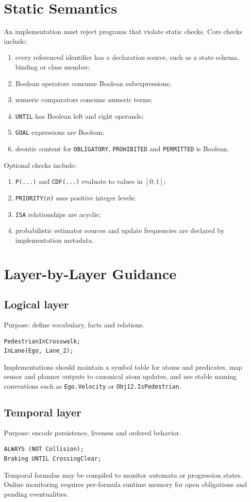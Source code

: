 \documentclass[11pt,a4paper]{article}
\begin{document}
\section{Static Semantics}
An implementation must reject programs that violate static checks. Core checks include:
\begin{enumerate}
  \item every referenced identifier has a declaration source, such as a state schema, binding or class member;
  \item Boolean operators consume Boolean subexpressions;
  \item numeric comparators consume numeric terms;
  \item \texttt{UNTIL} has Boolean left and right operands;
  \item \texttt{GOAL} expressions are Boolean;
  \item deontic content for \texttt{OBLIGATORY}, \texttt{PROHIBITED} and \texttt{PERMITTED} is Boolean.
\end{enumerate}
Optional checks include:
\begin{enumerate}
  \item \texttt{P(...)} and \texttt{CDF(...)} evaluate to values in $[0,1]$;
  \item \texttt{PRIORITY(n)} uses positive integer levels;
  \item \texttt{ISA} relationships are acyclic;
  \item probabilistic estimator sources and update frequencies are declared by implementation metadata.
\end{enumerate}

\section{Layer-by-Layer Guidance}
\subsection{Logical layer}
Purpose: define vocabulary, facts and relations.
\begin{verbatim}
PedestrianInCrosswalk;
InLane(Ego, Lane_2);
\end{verbatim}
Implementations should maintain a symbol table for atoms and predicates, map sensor and planner outputs to canonical atom updates, and use stable naming conventions such as \texttt{Ego.Velocity} or \texttt{Obj12.IsPedestrian}.

\subsection{Temporal layer}
Purpose: encode persistence, liveness and ordered behavior.
\begin{verbatim}
ALWAYS (NOT Collision);
Braking UNTIL CrossingClear;
\end{verbatim}
Temporal formulas may be compiled to monitor automata or progression states. Online monitoring requires per-formula runtime memory for open obligations and pending eventualities.
\end{document}
